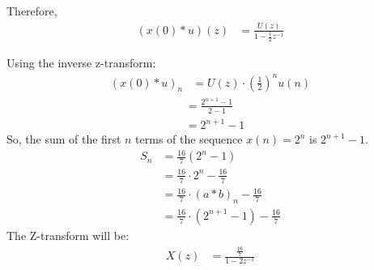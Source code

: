 \documentclass[journal,12pt,onecolumn]{IEEEtran}
\theoremstyle{remark}
\begin{document}
Therefore,
\begin{align}
(x(0) * u)(z) &= \frac{U(z)}{1 - \frac{1}{2}z^{-1}}
\end{align}

Using the inverse z-transform:
\begin{align}
(x(0) * u)_n &= U(z) \cdot \left( \frac{1}{2} \right)^n u(n)
\end{align}
\begin{align}
&= \frac{2^{n+1} - 1}{2 - 1} \\
&= 2^{n+1} - 1
\end{align}
So, the sum of the first \( n \) terms of the sequence \( x(n) = 2^n \) is \( 2^{n+1} - 1 \).
\begin{align}
S_n &= \frac{16}{7}(2^n-1) \\
&= \frac{16}{7} \cdot 2^n - \frac{16}{7} \\
&= \frac{16}{7} \cdot (a * b)_n - \frac{16}{7} \\
&= \frac{16}{7} \cdot (2^{n+1} - 1) - \frac{16}{7}
\end{align}
The Z-transform will be:
\begin{align}
X(z) &= \frac{\frac{16}{7}}{1 - 2z^{-1}}
\end{align}
\end{document}
